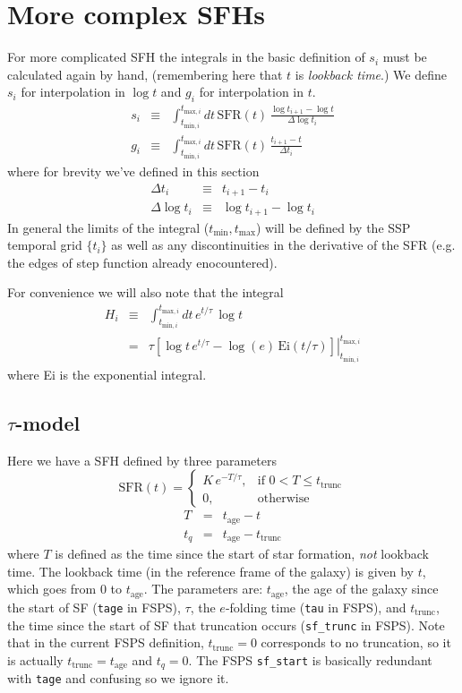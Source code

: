 \documentclass[12pt, letterpaper, preprint]{aastex}
\newcommand{\tmin}[1][]{t_{\mathrm{min} #1}}
\newcommand{\tmax}[1][]{t_{\mathrm{max} #1}}
\newcommand{\dlt}{\Delta\log t_i}
\newcommand{\dt}{\Delta t_i}
\newcommand{\tintegral}{\int_{\tmin[,i]}^{\tmax[,i]} dt}
\newcommand{\tinterval}{\right|_{\tmin[,i]}^{\tmax[,i]}}
\newcommand{\sftrunc}{t_{\mathrm{trunc}}}
\newcommand{\tage}{t_{\mathrm{age}}}
\begin{document}
\section{More complex SFHs}
For more complicated SFH the integrals in the basic definition of $s_i$ must be calculated again by hand, (remembering here that $t$ is \emph{lookback time}.)  
We define $s_i$ for interpolation in $\log t$ and $g_i$ for interpolation in $t$.
\begin{eqnarray}
s_i & \equiv & \tintegral \, \mathrm{SFR}(t) \, \frac{\log t_{i+1} - \log t}{\dlt} \\
g_i & \equiv & \tintegral \, \mathrm{SFR}(t) \, \frac{t_{i+1} - t}{\dt}
\end{eqnarray}
where for brevity we've defined in this section
\begin{eqnarray}
\dt & \equiv & t_{i+1} -  t_i  \nonumber \\
\dlt & \equiv & \log t_{i+1} - \log t_i \nonumber
\end{eqnarray}
In general the limits of the integral ($\tmin, \tmax$) will be defined by the SSP temporal grid $\{t_i\}$ as well as any discontinuities in the derivative of the SFR (e.g. the edges of step function already enocountered).

For convenience we will also note that the integral
\begin{eqnarray}
H_i & \equiv & \tintegral \, e^{t/\tau} \, \log t \nonumber \\
  & = & \left. \tau \left[ \log t \, e^{t/\tau} - \log(e) \, \mathrm{Ei}(t/\tau) \right]\tinterval
\end{eqnarray}
where Ei is the exponential integral.

\subsection{$\tau$-model}
Here we have a SFH defined by three parameters
\[ 
\mathrm{SFR}(t) = 
\begin{cases}
K \, e^{-T/\tau}, &  \text{if } 0 < T \leq t_{\mathrm{trunc}} \\
0, & \text{otherwise}
\end{cases}
\]
\begin{eqnarray}
T & = & \tage - t \nonumber \\
t_q & = & \tage - t_{\mathrm{trunc}} \nonumber 
\end{eqnarray}
where $T$ is defined as the time since the start of star formation, \emph{not} lookback time.  
The lookback time  (in the reference frame of the galaxy) is given by $t$, which goes from 0 to $\tage$.
The parameters are: 
$\tage$, the age of the galaxy since the start of SF (\texttt{tage} in FSPS), 
$\tau$, the $e$-folding time (\texttt{tau} in FSPS), and
$\sftrunc$, the time since the start of SF that truncation occurs (\texttt{sf\_trunc} in FSPS).
Note that in the current FSPS definition, $t_{\mathrm{trunc}}=0$ corresponds to no truncation, so it is actually $t_{\mathrm{trunc}} = \tage$ and $t_q=0$.
The FSPS \texttt{sf\_start} is basically redundant with \texttt{tage} and confusing so we ignore it.
\end{document}
